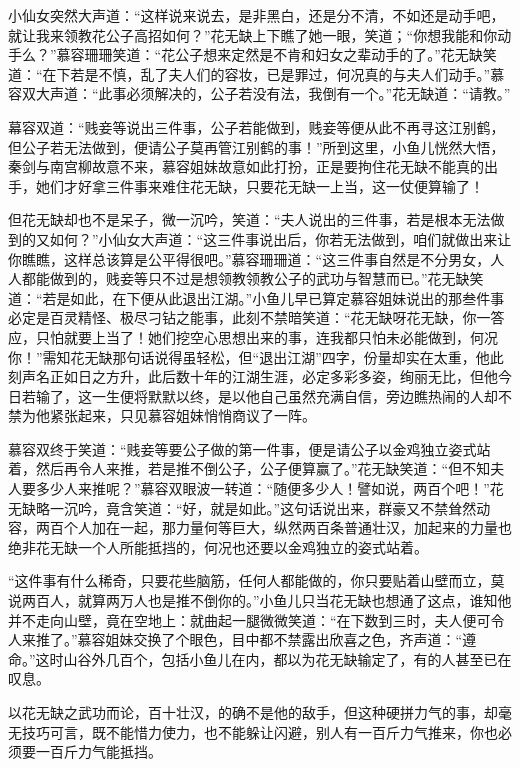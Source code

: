 \documentclass[12pt,oneside]{book}
\begin{document}
小仙女突然大声道：``这样说来说去，是非黑白，还是分不清，不如还是动手吧，就让我来领教花公子高招如何？''花无缺上下瞧了她一眼，笑道；``你想我能和你动手么？''慕容珊珊笑道：``花公子想来定然是不肯和妇女之辈动手的了。''花无缺笑道：``在下若是不慎，乱了夫人们的容妆，已是罪过，何况真的与夫人们动手。''慕容双大声道：``此事必须解决的，公子若没有法，我倒有一个。''花无缺道：``请教。''

幕容双道：``贱妾等说出三件事，公子若能做到，贱妾等便从此不再寻这江别鹤，但公子若无法做到，便请公子莫再管江别鹤的事！''所到这里，小鱼儿恍然大悟，秦剑与南宫柳故意不来，慕容姐妹故意如此打扮，正是要拘住花无缺不能真的出手，她们才好拿三件事来难住花无缺，只要花无缺一上当，这一仗便算输了！

但花无缺却也不是呆子，微一沉吟，笑道：``夫人说出的三件事，若是根本无法做到的又如何？''小仙女大声道：``这三件事说出后，你若无法做到，咱们就做出来让你瞧瞧，这样总该算是公平得很吧。''慕容珊珊道：``这三件事自然是不分男女，人人都能做到的，贱妾等只不过是想领教领教公子的武功与智慧而已。''花无缺笑道：``若是如此，在下便从此退出江湖。''小鱼儿早已算定慕容姐妹说出的那叁件事必定是百灵精怪、极尽刁钻之能事，此刻不禁暗笑道：``花无缺呀花无缺，你一答应，只怕就要上当了！她们挖空心思想出来的事，连我都只怕未必能做到，何况你！''需知花无缺那句话说得虽轻松，但``退出江湖''四字，份量却实在太重，他此刻声名正如日之方升，此后数十年的江湖生涯，必定多彩多姿，绚丽无比，但他今日若输了，这一生便将默默以终，是以他自己虽然充满自信，旁边瞧热闹的人却不禁为他紧张起来，只见慕容姐妹悄悄商议了一阵。

慕容双终于笑道：``贱妾等要公子做的第一件事，便是请公子以金鸡独立姿式站着，然后再令人来推，若是推不倒公子，公子便算赢了。''花无缺笑道：``但不知夫人要多少人来推呢？''慕容双眼波一转道：``随便多少人！譬如说，两百个吧！''花无缺略一沉吟，竟含笑道：``好，就是如此。''这句话说出来，群豪又不禁耸然动容，两百个人加在一起，那力量何等巨大，纵然两百条普通壮汉，加起来的力量也绝非花无缺一个人所能抵挡的，何况也还要以金鸡独立的姿式站着。

``这件事有什么稀奇，只要花些脑筋，任何人都能做的，你只要贴着山壁而立，莫说两百人，就算两万人也是推不倒你的。''小鱼儿只当花无缺也想通了这点，谁知他并不走向山壁，竟在空地上：就曲起一腿微微笑道：``在下数到三时，夫人便可令人来推了。''慕容姐妹交换了个眼色，目中都不禁露出欣喜之色，齐声道：``遵命。''这时山谷外几百个，包括小鱼儿在内，都以为花无缺输定了，有的人甚至已在叹息。

以花无缺之武功而论，百十壮汉，的确不是他的敌手，但这种硬拼力气的事，却毫无技巧可言，既不能惜力使力，也不能躲让闪避，别人有一百斤力气推来，你也必须要一百斤力气能抵挡。
\end{document}
